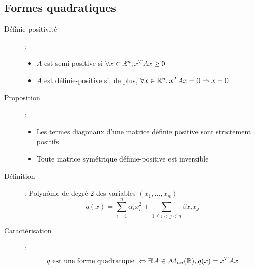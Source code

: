 \subsection{Formes quadratiques}
\begin{description}
\item[Définie-positivité] :
    \begin{itemize}
        \item $A$ est semi-positive si $\forall x\in\mathbb{R}^n, x^TAx\ge 0$
        \item $A$ est définie-positive si, de plus, $\forall x\in\mathbb{R}^n, x^TAx=0\Rightarrow x=0$
    \end{itemize}
\item[Proposition] :
    \begin{itemize}
        \item Les termes diagonaux d'une matrice définie positive sont strictement positifs
        \item Toute matrice symétrique définie-positive est inversible
    \end{itemize}
\item[Définition] : Polynôme de degré $2$ des variables $(x_1, \dots, x_n)$
    \[
        q(x)=\sum_{i=1}^n\alpha_ix_i^2
        + \sum_{1\le i<j<n}\beta x_ix_j
    \]
\item[Caractérisation] :
    \[
        q \textrm{ est une forme quadratique }
        \Leftrightarrow
        \exists !A\in\mathcal M_{nn}(\mathbb{R}), q(x)=x^TAx
    \]
\end{description}
